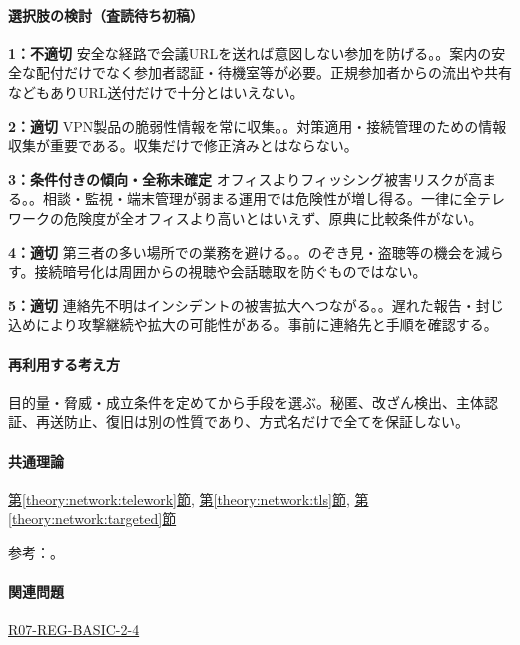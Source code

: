 \paragraph{選択肢の検討（査読待ち初稿）}\mbox{}\par

\noindent\textbf{1：不適切} 安全な経路で会議URLを送れば意図しない参加を防げる。。案内の安全な配付だけでなく参加者認証・待機室等が必要。正規参加者からの流出や共有などもありURL送付だけで十分とはいえない。\par

\noindent\textbf{2：適切} VPN製品の脆弱性情報を常に収集。。対策適用・接続管理のための情報収集が重要である。収集だけで修正済みとはならない。\par

\noindent\textbf{3：条件付きの傾向・全称未確定} オフィスよりフィッシング被害リスクが高まる。。相談・監視・端末管理が弱まる運用では危険性が増し得る。一律に全テレワークの危険度が全オフィスより高いとはいえず、原典に比較条件がない。\par

\noindent\textbf{4：適切} 第三者の多い場所での業務を避ける。。のぞき見・盗聴等の機会を減らす。接続暗号化は周囲からの視聴や会話聴取を防ぐものではない。\par

\noindent\textbf{5：適切} 連絡先不明はインシデントの被害拡大へつながる。。遅れた報告・封じ込めにより攻撃継続や拡大の可能性がある。事前に連絡先と手順を確認する。\par

\paragraph{再利用する考え方} 目的量・脅威・成立条件を定めてから手段を選ぶ。秘匿、改ざん検出、主体認証、再送防止、復旧は別の性質であり、方式名だけで全てを保証しない。

\paragraph{共通理論} \hyperref[theory:network:telework]{第\ref*{theory:network:telework}節}, \hyperref[theory:network:tls]{第\ref*{theory:network:tls}節}, \hyperref[theory:network:targeted]{第\ref*{theory:network:targeted}節}

\par 参考：\cite{net_meeting2020,net_telework}。

\paragraph{関連問題} \hyperref[q:r07-reg-basic-2-4]{R07-REG-BASIC-2-4}

